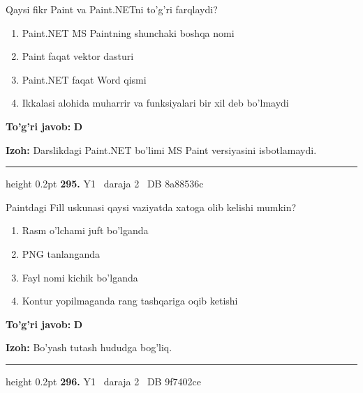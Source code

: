 \documentclass[10pt,a4paper,oneside]{article}
\begin{document}
\par
Qaysi fikr Paint va Paint.NETni to'g'ri farqlaydi?
\begin{enumerate}[label=\Alph*),leftmargin=9mm]
\item Paint.NET MS Paintning shunchaki boshqa nomi
\item Paint faqat vektor dasturi
\item Paint.NET faqat Word qismi
\item Ikkalasi alohida muharrir va funksiyalari bir xil deb bo'lmaydi
\end{enumerate}
\begin{tcolorbox}[enhanced,breakable,colback=teal!4,colframe=teal!45!black,boxrule=0.45pt,arc=1.2mm,left=2.8mm,right=2.8mm,top=2mm,bottom=2mm,before skip=2mm,after skip=2mm]
\textbf{\color{teal}To'g'ri javob:} \textbf{D}
\par\smallskip
\textbf{Izoh:} Darslikdagi Paint.NET bo'limi MS Paint versiyasini isbotlamaydi.
\end{tcolorbox}
\vspace{2mm}\hrule height 0.2pt \vspace{4mm}
\hypertarget{q295}{\textbf{\color{ink}295.}}  {\color{muted}\scriptsize Y1 \textbullet\ daraja 2 \textbullet\ DB 8a88536c}
\par
Paintdagi Fill uskunasi qaysi vaziyatda xatoga olib kelishi mumkin?
\begin{enumerate}[label=\Alph*),leftmargin=9mm]
\item Rasm o'lchami juft bo'lganda
\item PNG tanlanganda
\item Fayl nomi kichik bo'lganda
\item Kontur yopilmaganda rang tashqariga oqib ketishi
\end{enumerate}
\begin{tcolorbox}[enhanced,breakable,colback=teal!4,colframe=teal!45!black,boxrule=0.45pt,arc=1.2mm,left=2.8mm,right=2.8mm,top=2mm,bottom=2mm,before skip=2mm,after skip=2mm]
\textbf{\color{teal}To'g'ri javob:} \textbf{D}
\par\smallskip
\textbf{Izoh:} Bo'yash tutash hududga bog'liq.
\end{tcolorbox}
\vspace{2mm}\hrule height 0.2pt \vspace{4mm}
\hypertarget{q296}{\textbf{\color{ink}296.}}  {\color{muted}\scriptsize Y1 \textbullet\ daraja 2 \textbullet\ DB 9f7402ce}
\par
\end{document}
